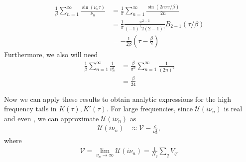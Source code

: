 \documentclass[12pt,a4paper]{scrartcl}
\numberwithin{equation}{section}
\begin{document}
\begin{align}
 \frac{1}{\beta}\sum\limits_{n=1 }^{\infty} \frac{\sin( \nu_n \tau )}{ \nu_n }
 &=\frac{1}{\pi}\sum\limits_{n=1 }^{\infty} \frac{\sin( 2n\pi \tau/\beta )}{ 2n }   \\
 &=\frac{1}{\pi} \frac{ \pi^{2-1} }{ (-1)^1     2(2-1)! } B_{2-1}(\tau/\beta) \\
 &= -\frac{1}{2\beta} \left( \tau -\frac{\beta}{2} \right)
\end{align}
Furthermore, we also will need
\begin{align}
 \frac{1}{\beta}\sum\limits_{n=1 }^{\infty} \frac{1}{\nu_n^2} 
 &= \frac{\beta}{\pi^2}\sum\limits_{n=1 }^{\infty} \frac{1}{(2n)^2}  \\
 &= \frac{\beta}{24}
\end{align}
 
 Now we can apply these results to obtain analytic expressions for the high frequency tails
 in $K(\tau),K'(\tau)$.
 For large frequencies, since $\mathcal{U}(i\nu_n)$ is real and even , we
can approximate $\mathcal{U}(i\nu_n)$ as
\begin{align}
 \mathcal{U}(i\nu_n) &\approx \mathcal{V} - \frac{c}{\nu_n^2 },
\end{align}
where 
\begin{align}
\mathcal{V}=\lim_{\nu_n\rightarrow \infty} \mathcal{U}(i\nu_n) = \frac{1}{N_q}\sum_q V_q. 
\end{align}
\end{document}
